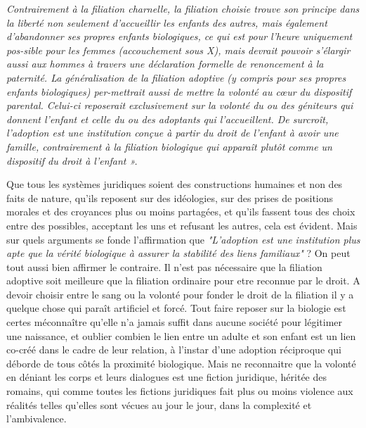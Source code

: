 \begin{displayquote}
\emph{Contrairement à la filiation charnelle, la filiation choisie trouve son principe dans la liberté non seulement d'accueillir les enfants des autres, mais également d'abandonner ses propres enfants biologiques, ce qui est pour l'heure uniquement pos-sible pour les femmes (accouchement sous X), mais devrait pouvoir s'élargir aussi aux hommes à travers une déclaration formelle de renoncement à la paternité. La généralisation de la filiation adoptive (y compris pour ses propres enfants biologiques) per-mettrait aussi de mettre la volonté au cœur du dispositif parental. Celui-ci reposerait exclusivement sur la volonté du ou des géniteurs qui donnent l'enfant et celle du ou des adoptants qui l'accueillent. De surcroît, l'adoption est une institution conçue à partir du droit de l'enfant à avoir une famille, contrairement à la filiation biologique qui apparaît plutôt comme un dispositif du droit à l'enfant ». }
\end{displayquote}

 Que tous les systèmes juridiques soient des constructions humaines et non des faits de nature, qu'ils reposent sur des idéologies, sur des prises de positions morales et des croyances plus ou moins partagées, et qu'ils fassent tous des choix entre des possibles, acceptant les uns et refusant les autres, cela est évident. Mais sur quels arguments se fonde l'affirmation que \emph{"L'adoption est une institution plus apte que la vérité biologique à assurer la stabilité des liens familiaux"} ?  On peut tout aussi bien affirmer le contraire. Il n'est pas nécessaire que la filiation adoptive soit meilleure que la filiation ordinaire pour etre reconnue par le droit. A devoir choisir entre le sang ou la volonté pour fonder le droit de la filiation il y a quelque chose qui paraît artificiel et forcé. Tout faire reposer sur la biologie est certes méconnaître qu'elle n'a jamais suffit dans aucune société pour légitimer une naissance, et oublier combien le lien entre un adulte et son enfant est un lien co-créé dans le cadre de leur relation, à l'instar d'une adoption réciproque qui déborde de tous côtés la proximité biologique. Mais ne reconnaitre que la volonté en déniant les corps et leurs dialogues est une fiction juridique, héritée des romains, qui comme toutes les fictions juridiques fait plus ou moins violence aux réalités telles qu'elles sont vécues au jour le jour, dans la complexité et l’ambivalence.
 
